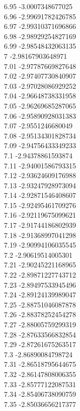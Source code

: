 {6.95	-3.0007348677025\\
6.96	-2.99691782426785\\
6.97	-2.99310371696866\\
6.98	-2.98929254827169\\
6.99	-2.98548432063135\\
7	-2.98167903648971\\
7.01	-2.97787669827648\\
7.02	-2.97407730840907\\
7.03	-2.97028086929252\\
7.04	-2.96648738331958\\
7.05	-2.96269685287065\\
7.06	-2.95890928031383\\
7.07	-2.9551246680049\\
7.08	-2.95134301828734\\
7.09	-2.94756433349233\\
7.1	-2.94378861593874\\
7.11	-2.94001586793315\\
7.12	-2.93624609176988\\
7.13	-2.93247928973094\\
7.14	-2.92871546408607\\
7.15	-2.92495461709276\\
7.16	-2.92119675099621\\
7.17	-2.91744186802939\\
7.18	-2.91368997041298\\
7.19	-2.90994106035545\\
7.2	-2.90619514005301\\
7.21	-2.90245221168965\\
7.22	-2.89871227743712\\
7.23	-2.89497533945496\\
7.24	-2.89124139989047\\
7.25	-2.88751046087878\\
7.26	-2.88378252454278\\
7.27	-2.88005759299319\\
7.28	-2.87633566832854\\
7.29	-2.87261675263517\\
7.3	-2.86890084798724\\
7.31	-2.86518795644675\\
7.32	-2.86147808006355\\
7.33	-2.85777122087531\\
7.34	-2.85406738090759\\
7.35	-2.85036656217377\\
}
